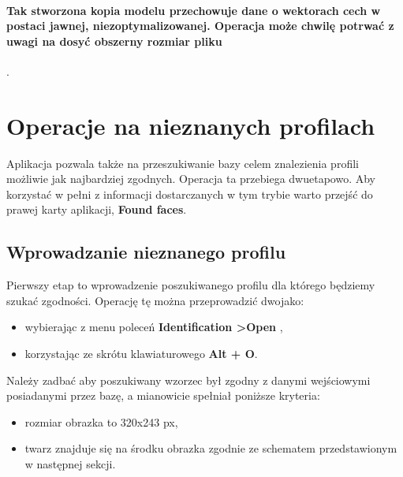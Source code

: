 \documentclass[]{article}
\begin{document}
\paragraph*{Tak stworzona kopia modelu przechowuje dane o wektorach cech w postaci jawnej, niezoptymalizowanej. Operacja może chwilę potrwać z uwagi na dosyć obszerny rozmiar pliku}.


\section[Odpytywanie bazy]{Operacje na nieznanych profilach}
\label{sec:query}
Aplikacja pozwala także na przeszukiwanie bazy celem znalezienia profili możliwie jak najbardziej zgodnych. Operacja ta przebiega dwuetapowo. Aby korzystać w pełni z informacji dostarczanych w tym trybie warto przejść do prawej karty aplikacji, \textbf{Found faces}.

\subsection{Wprowadzanie nieznanego profilu}
Pierwszy etap to wprowadzenie poszukiwanego profilu dla którego będziemy szukać zgodności. Operację tę można przeprowadzić dwojako:
\begin{itemize}
	\item wybierając z menu poleceń \textbf{Identification \textgreater \space Open	},
	\item korzystając ze skrótu klawiaturowego \textbf{Alt + O}.
\end{itemize}

Należy zadbać aby poszukiwany wzorzec był zgodny z danymi wejściowymi posiadanymi przez bazę, a mianowicie spełniał poniższe kryteria:
\begin{itemize}
	\item rozmiar obrazka to 320x243 px,
	\item twarz znajduje się na środku obrazka zgodnie ze schematem przedstawionym w następnej sekcji.
\end{itemize}
\end{document}
